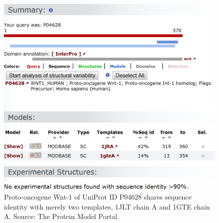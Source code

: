 \begin{figure}
\centering
\includegraphics[width=\linewidth]{Case/WntHomologyModeling.png}
\caption{Proto-oncogene Wnt-1 of UniProt ID P04628 shares sequence identity with merely two templates, 1JLT chain A and 1GTE chain A. Source: The Protein Model Portal.}
\label{Case:WntHomologyModeling}
\end{figure}

\chapterend
